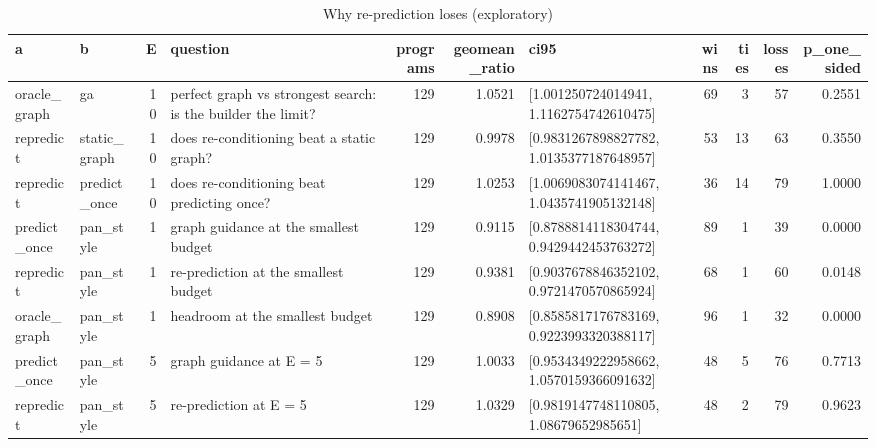 \begin{table}[t]
\centering
\caption{Why re-prediction loses (exploratory)}
\label{tab:v3-1-analysis-A-comparisons}
\begin{tabular}{llrlrrlrrrr}
\toprule
a & b & E & question & programs & geomean\_ratio & ci95 & wins & ties & losses & p\_one\_sided \\
\midrule
oracle\_graph & ga & 10 & perfect graph vs strongest search: is the builder the limit? & 129 & 1.0521 & [1.001250724014941, 1.1162754742610475] & 69 & 3 & 57 & 0.2551 \\
repredict & static\_graph & 10 & does re-conditioning beat a static graph? & 129 & 0.9978 & [0.9831267898827782, 1.0135377187648957] & 53 & 13 & 63 & 0.3550 \\
repredict & predict\_once & 10 & does re-conditioning beat predicting once? & 129 & 1.0253 & [1.0069083074141467, 1.0435741905132148] & 36 & 14 & 79 & 1.0000 \\
predict\_once & pan\_style & 1 & graph guidance at the smallest budget & 129 & 0.9115 & [0.8788814118304744, 0.9429442453763272] & 89 & 1 & 39 & 0.0000 \\
repredict & pan\_style & 1 & re-prediction at the smallest budget & 129 & 0.9381 & [0.9037678846352102, 0.9721470570865924] & 68 & 1 & 60 & 0.0148 \\
oracle\_graph & pan\_style & 1 & headroom at the smallest budget & 129 & 0.8908 & [0.8585817176783169, 0.9223993320388117] & 96 & 1 & 32 & 0.0000 \\
predict\_once & pan\_style & 5 & graph guidance at E = 5 & 129 & 1.0033 & [0.9534349222958662, 1.0570159366091632] & 48 & 5 & 76 & 0.7713 \\
repredict & pan\_style & 5 & re-prediction at E = 5 & 129 & 1.0329 & [0.9819147748110805, 1.08679652985651] & 48 & 2 & 79 & 0.9623 \\
\bottomrule
\end{tabular}
\end{table}
